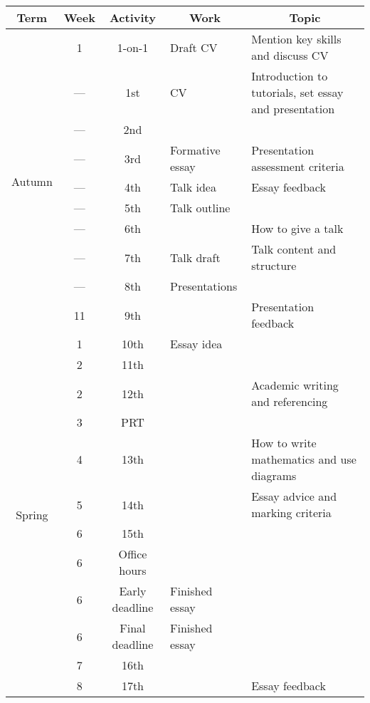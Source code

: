 \begin{table}\scriptsize
\centering
\begin{tabular}{c c c l l}
\toprule
\multicolumn{1}{c}{Term} & \multicolumn{1}{c}{Week} & \multicolumn{1}{c}{Activity} & \multicolumn{1}{c}{Work} & \multicolumn{1}{c}{Topic} \\
\midrule 
\multirow{10}{*}{Autumn} & \hphantom{0}1  & 1-on-1		& Draft CV		& Mention key skills and discuss CV \\
			 & \multicolumn{1}{c}{---}  & 1st	& CV			& Introduction to tutorials, set essay and presentation\\
			 & \multicolumn{1}{c}{---}  & 2nd	& 			& \\
			 & \multicolumn{1}{c}{---}  & 3rd	& Formative essay	& Presentation assessment criteria \\
			 & \multicolumn{1}{c}{---}  & 4th	& Talk idea		& Essay feedback \\
			 & \multicolumn{1}{c}{---}  & 5th	& Talk outline		&  \\
			 & \multicolumn{1}{c}{---}  & 6th	& 			& How to give a talk \\
			 & \multicolumn{1}{c}{---}  & 7th	& Talk draft		& Talk content and structure \\
			 & \multicolumn{1}{c}{---}  & 8th	& Presentations		& \\
			 & 11 		  & 9th			&			& Presentation feedback \\
\midrule
\multirow{15}{*}{Spring} & \hphantom{0}1  & 10th		& Essay idea		& \\
			 & \hphantom{0}2  & 11th		&			& \\
			 & \hphantom{0}2  & 12th		&			& Academic writing and referencing\\
			 & \hphantom{0}3  & PRT			&			& \\
			 & \hphantom{0}4  & 13th		&			& How to write mathematics and use diagrams \\
			 & \hphantom{0}5  & 14th		&			& Essay advice and marking criteria \\
			 & \hphantom{0}6  & 15th		&			& \\
			 & \hphantom{0}6  & Office hours	&			& \\
			 & \hphantom{0}6  & Early deadline	& Finished essay	& \\
			 & \hphantom{0}6  & Final deadline 	& Finished essay	& \\
			 & \hphantom{0}7  & 16th		&			& \\
			 & \hphantom{0}8  & 17th		&			& Essay feedback \\

\end{tabular}
\end{table}

